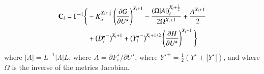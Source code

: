 \documentclass{warpdoc}
\newcommand{\alb}{\vspace{0.2cm}\\} %
\newcommand{\mfd}{\displaystyle}
\newcommand{\C}{{\bf C}}
\newcommand{\Dstar}{D^{\!\star}}
\newcommand{\Fstar}{F^{\!\star}}
\newcommand{\Ustar}{U^{\!\star}}
\newcommand{\Ystar}{Y^{\!\star}}
\begin{document}
%
\begin{align}
\C_i =
  \Gamma^{-1}
  \Bigg\{
    &-K^{X_i+\frac{1}{2}}_{ii} \left(\frac{\partial G}{\partial \Ustar}\right)^{X_i+1}
    -\mfd\frac{\left( {\Omega} |A| \right)_i^{X_i+\frac{1}{2}}}{2 {\Omega}^{X_i+1}}
                           +\frac{A^{X_i+1}}{2}\nonumber\alb
    &+\big({\Dstar_i}^-\big)^{X_i+1}
    +\big({\Ystar_i}^-\big)^{X_i+1/2} \left(\frac{\partial H}{\partial \Ustar}\right)^{X_i+1}
  \Bigg\}
\end{align}
%
where $|A|=L^{-1}  |\Lambda|  L$, where $A=\partial \Fstar_i/\partial \Ustar$, where ${\Ystar}^\pm=\frac{1}{2}(\Ystar\pm|\Ystar|)$, and where $\Omega$ is the inverse of the metrics Jacobian.

  
  
\end{document}
